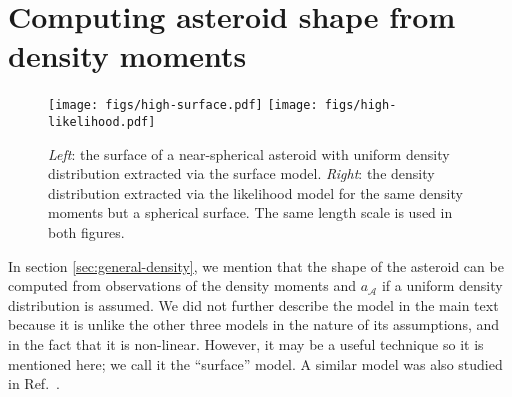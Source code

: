 
  

\section{Computing asteroid shape from density moments}
\label{app:find-surface}

\begin{figure*}
  \centering
  \texttt{[image: figs/high-surface.pdf]}\hfill
  \texttt{[image: figs/high-likelihood.pdf]}
  \caption{\textit{Left}: the surface of a near-spherical asteroid with uniform density distribution extracted via the surface model. \textit{Right}: the density distribution extracted via the likelihood model for the same density moments but a spherical surface. The same length scale is used in both figures.}
  \label{fig:surface-density}
\end{figure*}

In section \ref{sec:general-density}, we mention that the shape of the asteroid can be computed from observations of the density moments and $a_\mathcal{A}$ if a uniform density distribution is assumed. We did not further describe the model in the main text because it is unlike the other three models in the nature of its assumptions, and in the fact that it is non-linear. However, it may be a useful technique so it is mentioned here; we call it the ``surface'' model. A similar model was also studied in Ref.~\cite{BAXANSKY2007756}.

